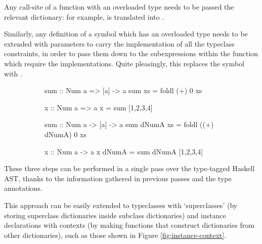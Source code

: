 \documentclass[dissertation.tex]{subfiles}
\begin{document}
{{{\begin{enumerate}
{                Any call-site of a function with an overloaded type needs to be passed the relevant dictionary: for example,  is translated into .

                Similarly, any definition of a symbol which has an overloaded type needs to be extended with parameters to carry the implementation of all the typeclass constraints, in order to pass them down to the subexpressions within the function which require the implementations. Quite pleasingly, this replaces the \haskell{=>} symbol with \haskell{->}.

                \begin{figure}[H]
                \centering
                \begin{subfigure}[t]{0.30\textwidth}
                \begin{haskellfigure}
                sum :: Num a => [a] -> a
                sum xs = foldl (+) 0 xs

                x :: Num a => a
                x = sum [1,2,3,4]
                \end{haskellfigure}
                \end{subfigure}
                \hspace{5mm}
                \begin{subfigure}[t]{0.45\textwidth}
                \begin{haskellfigure}
                sum :: Num a -> [a] -> a
                sum dNumA xs = foldl ((+) dNumA) 0 xs

                x :: Num a -> a
                x dNumA = sum dNumA [1,2,3,4]
                \end{haskellfigure}
                \end{subfigure}
                \end{figure}
            }
            \end{enumerate}

            These three steps can be performed in a single pass over the type-tagged Haskell AST, thanks to the information gathered in previous passes and the type annotations.

            This approach can be easily extended to typeclasses with `superclasses' (by storing superclass dictionaries inside subclass dictionaries) and instance declarations with contexts (by making functions that construct dictionaries from other dictionaries), such as those shown in Figure \ref{fig:instance-context}. 

}}}
\end{document}
